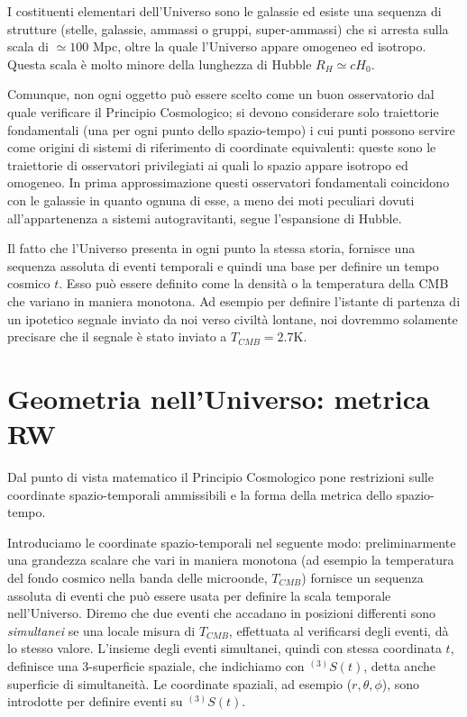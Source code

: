 I costituenti elementari dell'Universo sono le galassie ed esiste una sequenza
di strutture (stelle, galassie, ammassi o gruppi, super-ammassi) che si arresta
sulla scala di $\simeq 100$ Mpc, oltre la quale l'Universo appare omogeneo ed
isotropo. Questa scala è molto minore della lunghezza di Hubble $R_H \simeq c
H_0$.

Comunque, non ogni oggetto può essere scelto come un buon osservatorio dal quale
verificare il Principio Cosmologico; si devono considerare solo traiettorie
fondamentali (una per ogni punto dello spazio-tempo) i cui punti possono servire
come origini di sistemi di riferimento di coordinate equivalenti: queste sono le
traiettorie di osservatori privilegiati ai quali lo spazio appare isotropo ed
omogeneo.  In prima approssimazione questi osservatori fondamentali coincidono
con le galassie in quanto ognuna di esse, a meno dei moti peculiari dovuti
all'appartenenza a sistemi autogravitanti, segue l'espansione di Hubble.

Il fatto che l'Universo presenta in ogni punto la stessa storia, fornisce una
sequenza assoluta di eventi temporali e quindi una base per definire un tempo
cosmico $t$.  Esso può essere definito come la densità o la temperatura della
CMB che variano in maniera monotona. Ad esempio per definire l'istante di
partenza di un ipotetico segnale inviato da noi verso civiltà lontane, noi
dovremmo solamente precisare che il segnale è stato inviato a $T_{CMB} =2.7$K.

\section{Geometria nell'Universo: metrica RW}

Dal punto di vista matematico il Principio Cosmologico pone restrizioni sulle
coordinate spazio-temporali ammissibili e la forma della metrica dello
spazio-tempo.

Introduciamo le coordinate spazio-temporali nel seguente modo: preliminarmente
una grandezza scalare che vari in maniera monotona (ad esempio la temperatura
del fondo cosmico nella banda delle microonde, $T_{CMB}$) fornisce un sequenza
assoluta di eventi che può essere usata per definire la scala temporale
nell'Universo.  Diremo che due eventi che accadano in posizioni differenti sono
\emph{simultanei} se una locale misura di $T_{CMB}$, effettuata al verificarsi
degli eventi, dà lo stesso valore.  L'insieme degli eventi simultanei, quindi
con stessa coordinata $t$, definisce una 3-superficie spaziale, che indichiamo
con $^{(3)}S(t)$, detta anche superficie di simultaneità.  Le coordinate
spaziali, ad esempio ($r, \theta , \phi$), sono introdotte per definire eventi
su $^{(3)}S(t)$.

